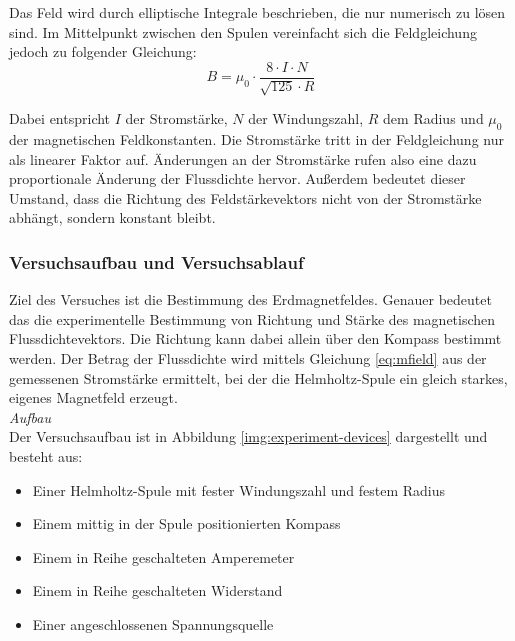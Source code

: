 Das Feld wird durch elliptische Integrale beschrieben, die nur numerisch zu lösen sind. Im Mittelpunkt zwischen den Spulen vereinfacht sich die Feldgleichung jedoch zu folgender Gleichung:
\begin{equation}
\label{eq:mfield}
B = \mu_{0} \cdot \frac{8 \cdot I \cdot N}{\sqrt{125} \cdot R}
\end{equation}

Dabei entspricht $I$ der Stromstärke, $N$ der Windungszahl, $R$ dem Radius und $\mu_{0}$ der magnetischen Feldkonstanten. Die Stromstärke tritt in der Feldgleichung nur als linearer Faktor auf. Änderungen an der Stromstärke rufen also eine dazu proportionale Änderung der Flussdichte hervor. Außerdem bedeutet dieser Umstand, dass die Richtung des Feldstärkevektors nicht von der Stromstärke abhängt, sondern konstant bleibt.\\

\subsubsection{Versuchsaufbau und Versuchsablauf}
\label{sec-2-3-4}
Ziel des Versuches ist die Bestimmung des Erdmagnetfeldes. Genauer bedeutet das die experimentelle Bestimmung von Richtung und Stärke des magnetischen Flussdichtevektors. Die Richtung kann dabei allein über den Kompass bestimmt werden. Der Betrag der Flussdichte wird mittels Gleichung \ref{eq:mfield} aus der gemessenen Stromstärke ermittelt, bei der die Helmholtz-Spule ein gleich starkes, eigenes Magnetfeld erzeugt.\\

\textit{Aufbau}\\
Der Versuchsaufbau ist in Abbildung \ref{img:experiment-devices} dargestellt und besteht aus: 
\begin{itemize}
	\setlength{\itemsep}{-5pt}
	\item Einer Helmholtz-Spule mit fester Windungszahl und festem Radius
	\item Einem mittig in der Spule positionierten Kompass
	\item Einem in Reihe geschalteten Amperemeter
	\item Einem in Reihe geschalteten Widerstand	
	\item Einer angeschlossenen Spannungsquelle
\end{itemize}

